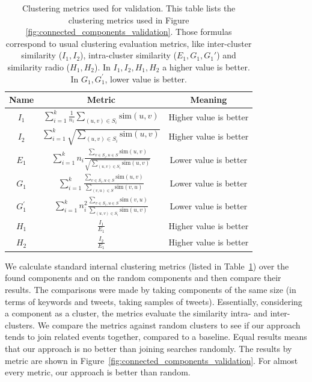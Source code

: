 \begin{table}
\centering
\begin{tabular}{| c | c | c |}
\hline
Name & Metric & Meaning \\
\hline
\hline
$I_1$ & $\sum_{i=1}^k \frac{1}{n_i} \sum_{(u,v) \in S_i} \text{sim}(u,v)$ & Higher value is better\\
\hline
$I_2$ & $\sum_{i=1}^k \sqrt{ \sum_{(u,v) \in S_i} \text{sim}(u,v)}$ & Higher value is better \\
\hline
$E_1$ & $\sum_{i=1}^{k} n_i \frac{\sum_{v \in S_i, u \in S} \text{sim}(u,v)}{\sqrt{\sum_{(u,v) \in S_i} \text{sim}(u,v)}}$ & Lower value is better \\
\hline
$G_1$ & $\sum_{i=1}^k \frac{\sum_{v \in S_i, u \in S}\text{sim}(u,v)}{\sum_{(v,u) \in S}\text{sim}(v,u)}$ & Lower value is better \\
\hline
$G_1^{'}$ & $\sum_{i=1}^k n_i^2 \frac{\sum_{v \in S_i, u \in S}\text{sim}(v,u)}{\sum_{(u,v) \in S_i}\text{sim}(u,v)}$ & Lower value is better \\
\hline
$H_1$ & $\frac{I_1}{E_1}$ & Higher value is better \\
\hline
$H_2$ & $\frac{I_2}{E_1}$ & Higher value is better \\
\hline
\end{tabular}
\caption[Clustering metrics used for validation]{Clustering metrics used for
  validation. This table lists the clustering metrics used in Figure
  \ref{fig:connected_components_validation}. Those formulas correspond to usual
  clustering evaluation metrics, like inter-cluster similarity ($I_1, I_2$),
  intra-cluster similarity ($E_1, G_1, G_1'$) and similarity radio ($H_1, H_2$).
  In $I_1, I_2, H_1, H_2$ a higher value is better.  In $G_1, G_1^{'}$, lower
  value is better. }
\label{table:clustering_metrics}
\end{table}

We calculate standard internal clustering metrics (listed in
Table~\ref{table:clustering_metrics}) over the found components and on the
random components and then compare their results. 
%
The comparisons were made by taking components of the same size (in terms of
keywords and tweets, taking samples of tweets). 
%
Essentially, considering a component as a cluster, the metrics evaluate the
similarity intra- and inter-clusters. 
%
We compare the metrics against random clusters to see if our approach tends to
join related events together, compared to a baseline.
%
Equal results means that our approach is no better than joining searches
randomly. 
%
The results by metric are shown in
Figure~\ref{fig:connected_components_validation}. For almost every metric, our
approach is better than random.


